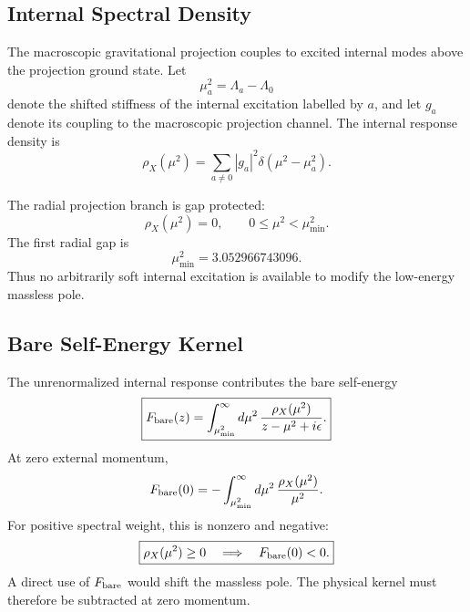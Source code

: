 \documentclass[11pt]{article}
\begin{document}
\subsection{Internal Spectral Density}

The macroscopic gravitational projection couples to excited internal modes above
the projection ground state. Let
\begin{equation}
\boxed{
\mu_a^2
=
\Lambda_a-\Lambda_0
}
\end{equation}
denote the shifted stiffness of the internal excitation labelled by \(a\), and let
\(g_a\) denote its coupling to the macroscopic projection channel. The internal
response density is
\begin{equation}
\boxed{
\rho_X(\mu^2)
=
\sum_{a\neq0}
|g_a|^2
\delta(\mu^2-\mu_a^2).
}
\end{equation}

The radial projection branch is gap protected:
\begin{equation}
\boxed{
\rho_X(\mu^2)=0,
\qquad
0\leq\mu^2<\mu_{\min}^2.
}
\end{equation}
The first radial gap is
\begin{equation}
\boxed{
\mu_{\min}^2
=
3.052966743096.
}
\end{equation}
Thus no arbitrarily soft internal excitation is available to modify the
low-energy massless pole.

\subsection{Bare Self-Energy Kernel}

The unrenormalized internal response contributes the bare self-energy
\begin{equation}
\boxed{
F_{\rm bare}(z)
=
\int_{\mu_{\min}^2}^{\infty}
d\mu^2\,
\frac{
\rho_X(\mu^2)
}{
z-\mu^2+i\epsilon
}.
}
\end{equation}
At zero external momentum,
\begin{equation}
F_{\rm bare}(0)
=
-\int_{\mu_{\min}^2}^{\infty}
d\mu^2\,
\frac{\rho_X(\mu^2)}{\mu^2}.
\end{equation}
For positive spectral weight, this is nonzero and negative:
\begin{equation}
\boxed{
\rho_X(\mu^2)\geq0
\quad\Longrightarrow\quad
F_{\rm bare}(0)<0.
}
\end{equation}
A direct use of \(F_{\rm bare}\) would shift the massless pole. The physical
kernel must therefore be subtracted at zero momentum.
\end{document}
